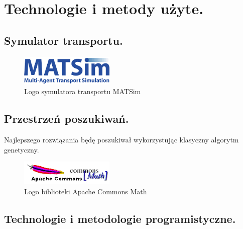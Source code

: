 \documentclass[twoside,12pt]{report}
\begin{document}
\chapter{Technologie i metody użyte.}
\section{Symulator transportu.}


\begin{figure}[ht]
\includegraphics[width=0.40\textwidth]{img/matsim}
\caption{Logo symulatora transportu MATSim \cite{matsim}} 
\end{figure}





\section{Przestrzeń poszukiwań.}

Najlepszego rozwiązania będę poszukiwał wykorzystując klasyczny algorytm genetyczny.

\begin{figure}[ht]
\includegraphics[width=0.40\textwidth]{img/math}
\caption{Logo biblioteki Apache Commons Math \cite{math}} 
\end{figure}



\section{Technologie i metodologie programistyczne.}
\end{document}
